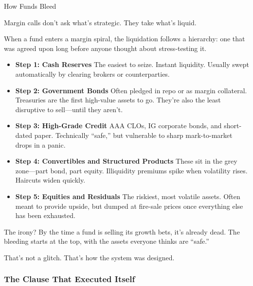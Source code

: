 \begin{TechnicalSidebar}{How Funds Bleed}

  Margin calls don’t ask what’s strategic.  
  They take what’s liquid.
  
  \medskip
  
  When a fund enters a margin spiral, the liquidation follows a hierarchy: one that was agreed upon long before anyone 
  thought about stress-testing it.

  \medskip
  
  \begin{itemize}
    \item \textbf{Step 1: Cash Reserves}  
    The easiest to seize. Instant liquidity. Usually swept automatically by clearing brokers or counterparties.
    
    \item \textbf{Step 2: Government Bonds}  
    Often pledged in repo or as margin collateral. Treasuries are the first high-value assets to go. They’re also the least disruptive to sell—until they aren’t.
    
    \item \textbf{Step 3: High-Grade Credit}  
    AAA CLOs, IG corporate bonds, and short-dated paper. Technically “safe,” but vulnerable to sharp mark-to-market drops in a panic.
    
    \item \textbf{Step 4: Convertibles and Structured Products}  
    These sit in the grey zone—part bond, part equity. Illiquidity premiums spike when volatility rises. Haircuts widen quickly.
    
    \item \textbf{Step 5: Equities and Residuals}  
    The riskiest, most volatile assets. Often meant to provide upside, but dumped at fire-sale prices once everything else has been exhausted.
  \end{itemize}
  
  \medskip
  
  The irony?  
  By the time a fund is selling its growth bets, it’s already dead.  
  The bleeding starts at the top, with the assets everyone thinks are “safe.”

  \medskip
  
  That’s not a glitch.  
  That’s how the system was designed.
  
\end{TechnicalSidebar}

\medskip

\subsubsection{The Clause That Executed Itself}

